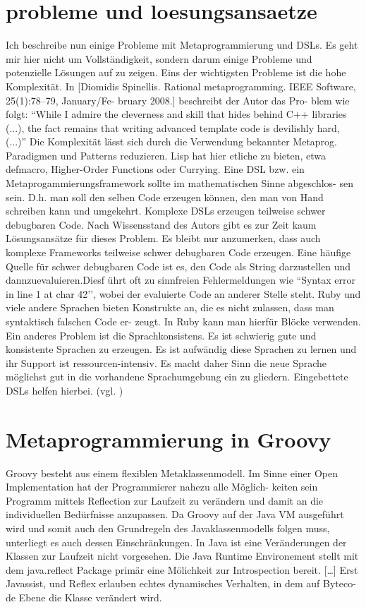 \documentclass[11pt,english,ngerman, headsepline]{scrreprt}
\begin{document}
\section{probleme und loesungsansaetze} 
Ich beschreibe nun einige Probleme mit Metaprogrammierung und DSLs. Es geht mir
hier nicht um Vollständigkeit, sondern darum einige Probleme und potenzielle
Lösungen auf zu zeigen.
Eins der wichtigsten Probleme ist die hohe Komplexität. In [Diomidis Spinellis.
Rational metaprogramming. IEEE Software, 25(1):78–79, January/Fe- bruary 2008.]
beschreibt der Autor das Pro- blem wie folgt:
“While I admire the cleverness and skill that hides behind C++ libraries (...),
the fact remains that writing advanced template code is devilishly hard, (...)”
Die Komplexität lässt sich durch die Verwendung bekannter Metaprog. Paradigmen
und Patterns reduzieren. Lisp hat hier etliche zu bieten, etwa defmacro,
Higher-Order Functions oder Currying.
Eine DSL bzw. ein Metaprogammierungsframework sollte im mathematischen Sinne
abgeschlos- sen sein. D.h. man soll den selben Code erzeugen können, den man von
Hand schreiben kann und umgekehrt.
Komplexe DSLs erzeugen teilweise schwer debugbaren Code. Nach Wissensstand des
Autors gibt es zur Zeit kaum Lösungsansätze für dieses Problem.
Es bleibt nur anzumerken, dass auch komplexe Frameworks teilweise schwer
debugbaren Code erzeugen.
Eine häufige Quelle für schwer debugbaren Code ist es, den Code als String
darzustellen und dannzuevaluieren.Diesf ührt oft zu sinnfreien Fehlermeldungen
wie “Syntax error in line 1 at char 42’’, wobei der evaluierte Code an anderer
Stelle steht. Ruby und viele andere Sprachen bieten Konstrukte an, die es nicht
zulassen, dass man syntaktisch falschen Code er- zeugt. In Ruby kann man hierfür
Blöcke verwenden.
Ein anderes Problem ist die Sprachkonsistens. Es ist schwierig gute und
konsistente Sprachen zu erzeugen. Es ist aufwändig diese Sprachen zu lernen und
ihr Support ist ressourcen-intensiv. Es macht daher Sinn die neue Sprache
möglichst gut in die vorhandene Sprachumgebung ein zu gliedern. Eingebettete
DSLs helfen hierbei.
(vgl. \cite{biekermetaprogrammierung})

\section{Metaprogrammierung in Groovy}
Groovy besteht aus einem flexiblen Metaklassenmodell. Im Sinne einer Open
Implementation hat der Programmierer nahezu alle Möglich- keiten sein Programm
mittels Reflection zur Laufzeit zu verändern und damit an die individuellen
Bedürfnisse anzupassen. \cite{mpInGroovy} Da Groovy auf der Java VM ausgeführt
wird und somit auch den Grundregeln des Javaklassenmodells folgen muss,
unterliegt es auch dessen Einschränkungen. In Java ist eine Veränderungen der
Klassen zur Laufzeit nicht vorgesehen. Die Java Runtime Environement stellt mit
dem java.reflect Package primär eine Mölichkeit zur Introspection bereit.
[\ldots] 
Erst Javassist, und Reflex erlauben echtes dynamisches
Verhalten, in dem auf Byteco- de Ebene die Klasse verändert wird. 
\end{document}
